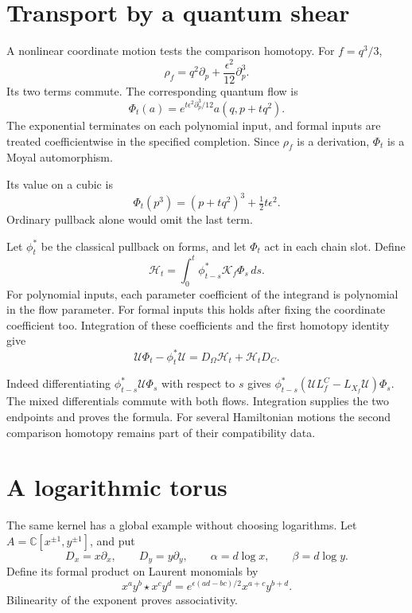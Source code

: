 \section{Transport by a quantum shear}

A nonlinear coordinate motion tests the comparison homotopy.
For $f=q^3/3$,
\[
 \rho_f=q^2\partial_p+\frac{\epsilon^2}{12}\partial_p^3.
\]
Its two terms commute. The corresponding quantum flow is
\[
 \Phi_t(a)=e^{t\epsilon^2\partial_p^3/12}a(q,p+tq^2).
\]
The exponential terminates on each polynomial input, and
formal inputs are treated coefficientwise in the specified
completion. Since $\rho_f$ is a derivation, $\Phi_t$ is a
Moyal automorphism.

Its value on a cubic is
\[
 \Phi_t(p^3)=(p+tq^2)^3+\tfrac12t\epsilon^2.
\]
Ordinary pullback alone would omit the last term.

Let $\phi_t^*$ be the classical pullback on forms, and
let $\Phi_t$ act in each chain slot. Define
\begin{equation}\label{mht:eq:cyclic-flow-homotopy}
 \mathcal H_t=\int_0^t\phi_{t-s}^*\mathcal K_f\Phi_s\,ds.
\end{equation}
For polynomial inputs, each parameter coefficient of the
integrand is polynomial in the flow parameter. For formal
inputs this holds after fixing the coordinate coefficient too.
Integration of these coefficients and the first homotopy
identity give
\[
 \mathcal U\Phi_t-\phi_t^*\mathcal U
       =D_\Omega\mathcal H_t+\mathcal H_tD_C.
\]

Indeed differentiating $\phi_{t-s}^*\mathcal U\Phi_s$
with respect to $s$ gives
$\phi_{t-s}^*(\mathcal U L_f^C-L_{X_f}\mathcal U)\Phi_s$.
The mixed differentials commute with both flows.
Integration supplies the two endpoints and proves the formula.
For several Hamiltonian motions the second comparison
homotopy remains part of their compatibility data.

\section{A logarithmic torus}

The same kernel has a global example without choosing
logarithms. Let $A=\mathbb C[x^{\pm1},y^{\pm1}]$, and put
\[
 D_x=x\partial_x,\qquad D_y=y\partial_y,\qquad
 \alpha=d\log x,\qquad\beta=d\log y.
\]
Define its formal product on Laurent monomials by
\[
 x^ay^b\star x^cy^d
    =e^{\epsilon(ad-bc)/2}x^{a+c}y^{b+d}.
\]
Bilinearity of the exponent proves associativity.

